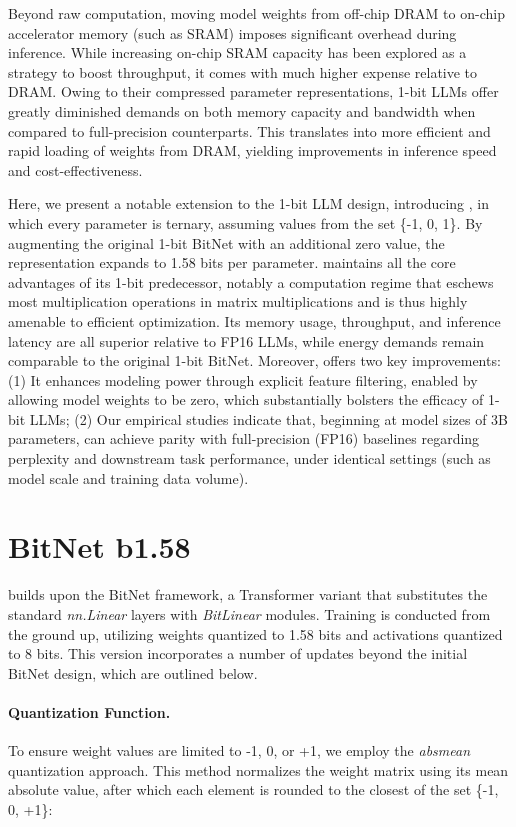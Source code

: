 Beyond raw computation, moving model weights from off-chip DRAM to on-chip accelerator memory (such as SRAM) imposes significant overhead during inference. While increasing on-chip SRAM capacity has been explored as a strategy to boost throughput, it comes with much higher expense relative to DRAM. Owing to their compressed parameter representations, 1-bit LLMs offer greatly diminished demands on both memory capacity and bandwidth when compared to full-precision counterparts. This translates into more efficient and rapid loading of weights from DRAM, yielding improvements in inference speed and cost-effectiveness.

Here, we present a notable extension to the 1-bit LLM design, introducing \textbf{}, in which every parameter is ternary, assuming values from the set \{-1, 0, 1\}. By augmenting the original 1-bit BitNet with an additional zero value, the representation expands to 1.58 bits per parameter.  maintains all the core advantages of its 1-bit predecessor, notably a computation regime that eschews most multiplication operations in matrix multiplications and is thus highly amenable to efficient optimization. Its memory usage, throughput, and inference latency are all superior relative to FP16 LLMs, while energy demands remain comparable to the original 1-bit BitNet. Moreover,  offers two key improvements: (1) It enhances modeling power through explicit feature filtering, enabled by allowing model weights to be zero, which substantially bolsters the efficacy of 1-bit LLMs; (2) Our empirical studies indicate that, beginning at model sizes of 3B parameters,  can achieve parity with full-precision (FP16) baselines regarding perplexity and downstream task performance, under identical settings (such as model scale and training data volume).

\section{BitNet b1.58}

 builds upon the BitNet framework, a Transformer variant that substitutes the standard \emph{nn.Linear} layers with \emph{BitLinear} modules. Training is conducted from the ground up, utilizing weights quantized to 1.58 bits and activations quantized to 8 bits. This version incorporates a number of updates beyond the initial BitNet design, which are outlined below.

\paragraph{Quantization Function.} To ensure weight values are limited to -1, 0, or +1, we employ the \emph{absmean} quantization approach. This method normalizes the weight matrix using its mean absolute value, after which each element is rounded to the closest of the set \{-1, 0, +1\}:

